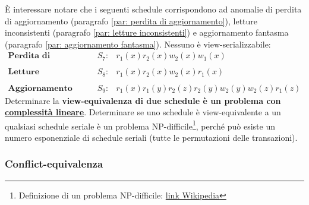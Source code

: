 \documentclass[a4paper]{article}
\begin{document}
	È interessare notare che i seguenti schedule corrispondono ad anomalie di perdita di aggiornamento (paragrafo \ref{par: perdita di aggiornamento}), letture inconsistenti (paragrafo \ref{par: letture inconsistenti}) e aggiornamento fantasma (paragrafo \ref{par: aggiornamento fantasma}). Nessuno è view-serializzabile:
	\begin{equation*}
		\begin{array}{lll}
			\textbf{Perdita di aggiornamento} & S_{7} : & r_{1}\left(x\right) r_{2}\left(x\right) w_{2}\left(x\right) w_{1}\left(x\right) \\
			\\
			\textbf{Letture inconsistenti} & S_{8} : & r_{1}\left(x\right) r_{2}\left(x\right) w_{2}\left(x\right) r_{1}\left(x\right) \\
			\\
			\textbf{Aggiornamento fantasma} & S_{9} : & r_{1}\left(x\right) r_{1}\left(y\right) r_{2}\left(z\right) r_{2}\left(y\right) w_{2}\left(y\right) w_{2}\left(z\right) r_{1}\left(z\right)
		\end{array}
	\end{equation*}
	Determinare la \textbf{view-equivalenza di due schedule è un problema con \underline{complessità lineare}}. Determinare se uno schedule è view-equivalente a un qualsiasi schedule seriale è un problema NP-difficile\footnote{Definizione di un problema NP-difficile: \href{https://it.wikipedia.org/wiki/NP-difficile}{link Wikipedia}}, perché può esiste un numero esponenziale di schedule seriali (tutte le permutazioni delle transazioni).\newpage
	
	\subsubsection{Conflict-equivalenza}
	
\end{document}
